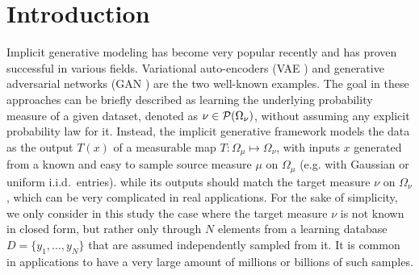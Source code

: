 
\section{Introduction}




Implicit generative modeling \cite{diggle1984monte, mohamed2016learning} has become very popular recently and has proven successful in various fields. Variational auto-encoders (VAE \cite{kingma2013VAE}) and generative adversarial networks (GAN \cite{goodfellow2014generative}) are the two well-known examples.
The goal in these approaches can be briefly described as learning the underlying probability measure of a given dataset, denoted as $\nu \in {\cal P}(\Omega_\nu)$, without assuming any explicit probability law for it.
Instead, the implicit generative framework models the data as the output $T(x)$ of a measurable map $T: \Omega_\mu \mapsto \Omega_\nu$, with inputs $x$ generated from a known and easy to sample source measure $\mu$ on $\Omega_\mu$ (e.g. with Gaussian or uniform i.i.d.\ entries). while its outputs should match the target measure $\nu$ on $\Omega_\nu$, which can be very complicated in real applications.
For the sake of simplicity, we only consider in this study the case where the target measure $\nu$ is not known in closed form, but rather only through $N$ elements from a learning database $D = \{y_1 , \dots , y_N \}$ that are assumed independently sampled from it. It is common in applications to have a very large amount of millions or billions of such samples.


